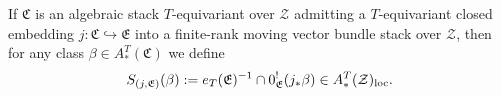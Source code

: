 \begin{definition}\label{rl-0010}
  If \(\mathfrak C\) is an algebraic stack \(T\)-equivariant over \(\mathcal Z\) admitting a \(T\)-equivariant closed embedding \(j:\mathfrak C\hookrightarrow \mathfrak E\) into a finite-rank moving vector bundle stack over \(\mathcal Z\), then for any class \(\beta \in A^T_*(\mathfrak C)\) we define
  \begin{align*}
    S_{(j,\mathfrak E)}(\beta) := e_T(\mathfrak E)^{-1}\cap 0^!_{\mathfrak E}(j_*\beta)\in A^T_*(\mathcal Z)_{\operatorname{loc}}.
  \end{align*}
\end{definition}
